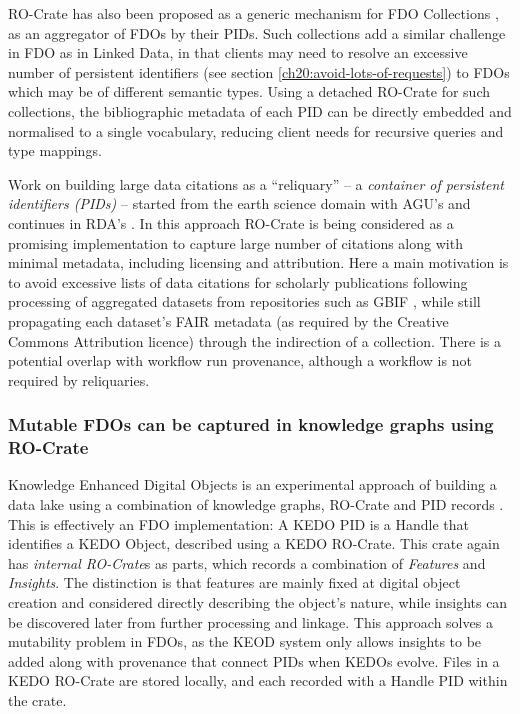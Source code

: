 RO-Crate has also been proposed as a generic mechanism for FDO Collections \cite{fdo-collections}, as an aggregator of FDOs by their PIDs. Such collections add a similar challenge in FDO as in Linked Data, in that clients may need to resolve an excessive number of persistent identifiers (see section \vref{ch20:avoid-lots-of-requests}) to FDOs which may be of different semantic types. 
Using a detached RO-Crate for such collections, the bibliographic metadata of each PID can be directly embedded and normalised to a single vocabulary, reducing client needs for recursive queries and type mappings. 
 
Work on building large data citations as a ``reliquary'' -- a \emph{container of persistent identifiers (PIDs)} \cite{Buck 2022} -- started from the earth science domain with AGU's  and continues in RDA's . In this approach RO-Crate is being considered as a promising implementation to capture large number of citations along with minimal metadata, including licensing and attribution. Here a main motivation is to avoid excessive lists of data citations for scholarly publications following processing of aggregated datasets from repositories such as GBIF \cite{ch8-7}, while still propagating each dataset's FAIR metadata (as required by the Creative Commons Attribution licence) through the indirection of a collection. There is a potential overlap with workflow run provenance, although a workflow is not required by reliquaries.


\subsubsection{Mutable FDOs can be captured in knowledge graphs using RO-Crate}
\label{ch61:datalakes}

Knowledge Enhanced Digital Objects  \cite{Luo 2022} is an experimental approach of building a data lake using a combination of knowledge graphs, RO-Crate and PID records \cite{Luo 2023}. This is effectively an FDO implementation: A KEDO PID is a Handle that identifies a KEDO Object, described using a KEDO RO-Crate. This crate again has \emph{internal RO-Crate}s as parts, which records a combination of \emph{Features} and \emph{Insights}. The distinction is that features are mainly fixed at digital object creation and considered directly describing the object's nature, while insights can be discovered later from further processing and linkage. This approach solves a mutability problem in FDOs, as the KEOD system only allows insights to be added along with provenance that connect PIDs when KEDOs evolve. Files in a KEDO RO-Crate are stored locally, and each recorded with a Handle PID within the crate.

